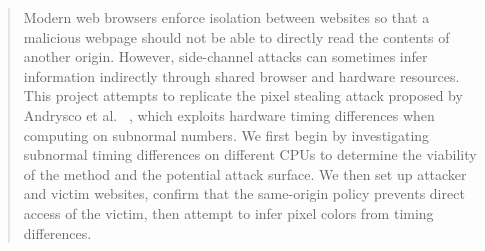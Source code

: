 \begin{abstract}

Modern web browsers enforce isolation between websites
so that a malicious webpage should not be able to directly
read the contents of another origin. However, side-channel
attacks can sometimes infer information indirectly through
shared browser and hardware resources. This project attempts to replicate the pixel stealing attack proposed by Andrysco et al. ~\cite{andrysco2015subnormal}, which exploits hardware timing differences when computing on subnormal numbers. We first begin by investigating subnormal timing differences on different CPUs to determine the viability of the method and the potential attack surface. We then set up attacker and victim websites, confirm that the same-origin policy prevents direct access of the victim, then attempt to infer pixel colors from timing differences.

\end{abstract}
